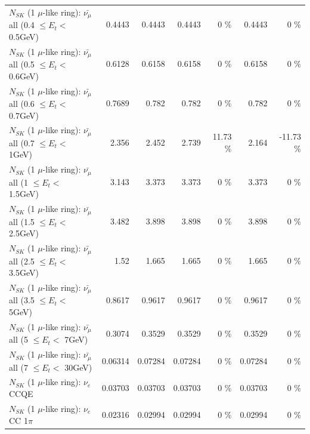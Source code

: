 \begin{table}
\begin{tabular}{| l | r | r | r  r | r  r |}
 $N_{SK}$ (1 $\mu$-like ring): $\bar{\nu_{\mu}}$ all (0.4 $\leq E_{t} <$ 0.5GeV) &          0.4443 &          0.4443 &          0.4443 &        0 \%  &          0.4443 &        0 \%  \\ 
 $N_{SK}$ (1 $\mu$-like ring): $\bar{\nu_{\mu}}$ all (0.5 $\leq E_{t} <$ 0.6GeV) &          0.6128 &          0.6158 &          0.6158 &        0 \%  &          0.6158 &        0 \%  \\ 
 $N_{SK}$ (1 $\mu$-like ring): $\bar{\nu_{\mu}}$ all (0.6 $\leq E_{t} <$ 0.7GeV) &          0.7689 &           0.782 &           0.782 &        0 \%  &           0.782 &        0 \%  \\ 
   $N_{SK}$ (1 $\mu$-like ring): $\bar{\nu_{\mu}}$ all (0.7 $\leq E_{t} <$ 1GeV) &           2.356 &           2.452 &           2.739 &    11.73 \%  &           2.164 &   -11.73 \%  \\ 
   $N_{SK}$ (1 $\mu$-like ring): $\bar{\nu_{\mu}}$ all (1 $\leq E_{t} <$ 1.5GeV) &           3.143 &           3.373 &           3.373 &        0 \%  &           3.373 &        0 \%  \\ 
 $N_{SK}$ (1 $\mu$-like ring): $\bar{\nu_{\mu}}$ all (1.5 $\leq E_{t} <$ 2.5GeV) &           3.482 &           3.898 &           3.898 &        0 \%  &           3.898 &        0 \%  \\ 
 $N_{SK}$ (1 $\mu$-like ring): $\bar{\nu_{\mu}}$ all (2.5 $\leq E_{t} <$ 3.5GeV) &            1.52 &           1.665 &           1.665 &        0 \%  &           1.665 &        0 \%  \\ 
   $N_{SK}$ (1 $\mu$-like ring): $\bar{\nu_{\mu}}$ all (3.5 $\leq E_{t} <$ 5GeV) &          0.8617 &          0.9617 &          0.9617 &        0 \%  &          0.9617 &        0 \%  \\ 
     $N_{SK}$ (1 $\mu$-like ring): $\bar{\nu_{\mu}}$ all (5 $\leq E_{t} <$ 7GeV) &          0.3074 &          0.3529 &          0.3529 &        0 \%  &          0.3529 &        0 \%  \\ 
    $N_{SK}$ (1 $\mu$-like ring): $\bar{\nu_{\mu}}$ all (7 $\leq E_{t} <$ 30GeV) &         0.06314 &         0.07284 &         0.07284 &        0 \%  &         0.07284 &        0 \%  \\ 
\hline
\hline
\hline
                                      $N_{SK}$ (1 $\mu$-like ring): $\nu_e$ CCQE &         0.03703 &         0.03703 &         0.03703 &        0 \%  &         0.03703 &        0 \%  \\ 
                                 $N_{SK}$ (1 $\mu$-like ring): $\nu_e$ CC 1$\pi$ &         0.02316 &         0.02994 &         0.02994 &        0 \%  &         0.02994 &        0 \%  \\ 

\end{tabular}
\end{table}
